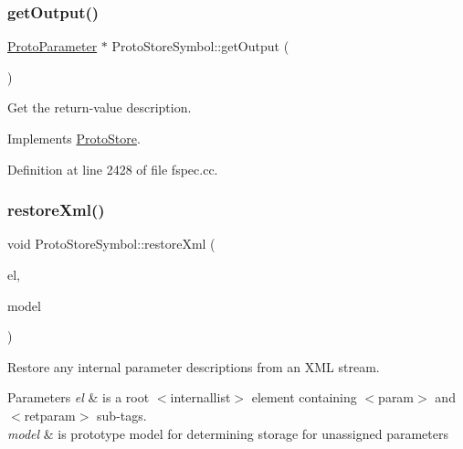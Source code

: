 \subsubsection{\texorpdfstring{getOutput()}{getOutput()}}
{\footnotesize\ttfamily \mbox{\hyperlink{class_proto_parameter}{Proto\+Parameter}} $\ast$ Proto\+Store\+Symbol\+::get\+Output (\begin{DoxyParamCaption}\item[{void}]{ }\end{DoxyParamCaption})\hspace{0.3cm}{\ttfamily [virtual]}}



Get the return-\/value description. 



Implements \mbox{\hyperlink{class_proto_store_aeb240f8e1b797060196c4bb7be000197}{Proto\+Store}}.



Definition at line 2428 of file fspec.\+cc.

\mbox{\label{class_proto_store_symbol_a6438185b37fc367226073f194a38d110}} 
\subsubsection{\texorpdfstring{restoreXml()}{restoreXml()}}
{\footnotesize\ttfamily void Proto\+Store\+Symbol\+::restore\+Xml (\begin{DoxyParamCaption}\item[{const \mbox{\hyperlink{class_element}{Element}} $\ast$}]{el,  }\item[{\mbox{\hyperlink{class_proto_model}{Proto\+Model}} $\ast$}]{model }\end{DoxyParamCaption})\hspace{0.3cm}{\ttfamily [virtual]}}



Restore any internal parameter descriptions from an X\+ML stream. 


\begin{DoxyParams}{Parameters}
{\em el} & is a root $<$internallist$>$ element containing $<$param$>$ and $<$retparam$>$ sub-\/tags. \\
\hline
{\em model} & is prototype model for determining storage for unassigned parameters \\
\hline
\end{DoxyParams}


